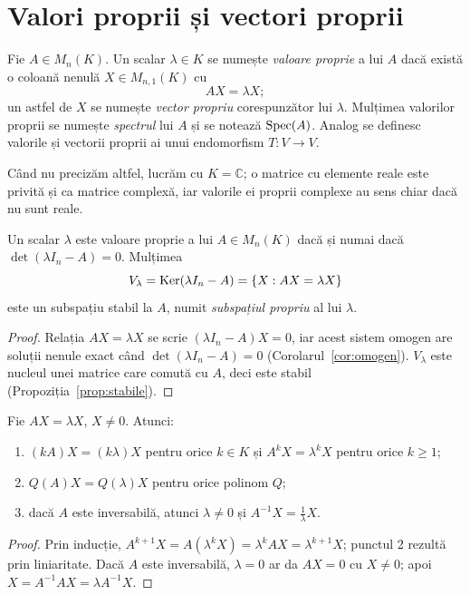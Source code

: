 \section{Valori proprii și vectori proprii}

\begin{definitie}
Fie $A\in M_n(K)$. Un scalar $\lambda\in K$ se numește \emph{valoare proprie} a lui $A$ dacă există o coloană nenulă $X\in M_{n,1}(K)$ cu
\[
AX=\lambda X ;
\]
un astfel de $X$ se numește \emph{vector propriu} corespunzător lui $\lambda$. Mulțimea valorilor proprii se numește \emph{spectrul} lui $A$ și se notează $\operatorname{Spec}(A)$. Analog se definesc valorile și vectorii proprii ai unui endomorfism $T:V\to V$.
\end{definitie}

Când nu precizăm altfel, lucrăm cu $K=\mathbb{C}$; o matrice cu elemente reale este privită și ca matrice complexă, iar valorile ei proprii complexe au sens chiar dacă nu sunt reale.

\begin{teorema}\label{teo:valpropdet}
Un scalar $\lambda$ este valoare proprie a lui $A\in M_n(K)$ dacă și numai dacă $\det(\lambda I_n-A)=0$. Mulțimea
\[
V_\lambda=\operatorname{Ker}(\lambda I_n-A)=\{X: AX=\lambda X\}
\]
este un subspațiu stabil la $A$, numit \emph{subspațiul propriu} al lui $\lambda$.
\end{teorema}

\begin{proof}
Relația $AX=\lambda X$ se scrie $(\lambda I_n-A)X=0$, iar acest sistem omogen are soluții nenule exact când $\det(\lambda I_n-A)=0$ (Corolarul~\ref{cor:omogen}). $V_\lambda$ este nucleul unei matrice care comută cu $A$, deci este stabil (Propoziția~\ref{prop:stabile}).
\end{proof}

\begin{propozitie}\label{prop:valpropputeri}
Fie $AX=\lambda X$, $X\neq0$. Atunci:
\begin{enumerate}
\item $(kA)X=(k\lambda)X$ pentru orice $k\in K$ și $A^kX=\lambda^kX$ pentru orice $k\ge1$;
\item $Q(A)X=Q(\lambda)X$ pentru orice polinom $Q$;
\item dacă $A$ este inversabilă, atunci $\lambda\neq0$ și $A^{-1}X=\frac1\lambda X$.
\end{enumerate}
\end{propozitie}

\begin{proof}
Prin inducție, $A^{k+1}X=A(\lambda^kX)=\lambda^kAX=\lambda^{k+1}X$; punctul 2 rezultă prin liniaritate. Dacă $A$ este inversabilă, $\lambda=0$ ar da $AX=0$ cu $X\neq0$; apoi $X=A^{-1}AX=\lambda A^{-1}X$.
\end{proof}

